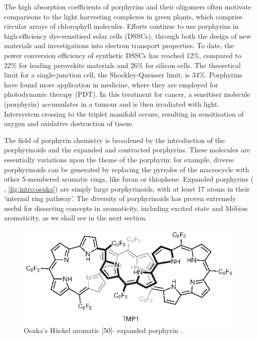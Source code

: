 	The high absorption coefficients of porphyrins and their oligomers often motivate comparisons to the light harvesting complexes in green plants, which comprise circular arrays of chlorophyll molecules.\autocite{VanGrondelle1994,McDermott1995} Efforts continue to use porphyrins in high-efficiency dye-sensitised solar cells (DSSCs), through both the design of new materials and investigations into electron transport properties.\autocite{Higashino2015,Gilbert2015} To date, the power conversion efficiency of synthetic DSSCs has reached 12\%, compared to 22\% for leading perovskite materials and 26\% for silicon cells.\autocite{NREL2016} The theoretical limit for a single-junction cell, the Shockley-Queisser limit, is 34\%.\autocite{Shockley1961} Porphyrins have found more application in medicine, where they are employed for photodynamic therapy (PDT). In this treatment for cancer, a sensitiser molecule (porphyrin) accumulates in a tumour and is then irradiated with light. Intersystem crossing to the triplet manifold occurs, resulting in sensitisation of oxygen and oxidative destruction of tissue.\autocite{Mody2000,Ethirajan2011}

	The field of porphyrin chemistry is broadened by the introduction of the porphyrinoids and the expanded and contracted porphyrins.\autocite{Stepien2011,Mack2016} These molecules are essentially variations upon the theme of the porphyrin: for example, diverse porphyrinoids can be generated by replacing the pyrroles of the macrocycle with other 5-membered aromatic rings, like furan or thiophene.\autocite{Vogel1989,Vogel2000} Expanded porphyrins ( , \autoref{fig:intro:osuka}) are simply large porphyrinoids, with at least 17 atoms in their `internal ring pathway'.\autocite{Sessler2003,Saito2011} The diversity of porphyrinoids has proven extremely useful for dissecting concepts in aromaticity,\autocite{Osuka2011,Stepien2011,Wu2013,Pawlicki2015} including excited state and M\"obius aromaticity, as we shall see in the next section. 

	\begin{figure}[ht!]
		\centering\includegraphics{figures/intro/osuka.eps} 
		\caption[]{Osuka's H\"uckel aromatic [50]-\pii{} expanded porphyrin .\autocite{Soya2015}}
		\label{fig:intro:osuka}
	\end{figure}

